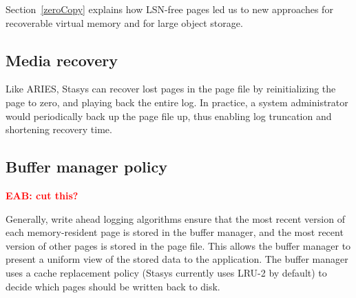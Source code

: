 \documentclass[letterpaper,twocolumn,10pt]{article}
\newcommand{\yad}{Stasys\xspace}
\newcommand{\eab}[1]{\textcolor{red}{\bf EAB: #1}}
\newcommand{\eat}[1]{}
\begin{document}
Section~\ref{zeroCopy} explains how LSN-free pages led us to new 
approaches for recoverable virtual memory and for large object storage.

\subsection{Media recovery}

Like ARIES, \yad can recover lost pages in the page file by
reinitializing the page to zero, and playing back the entire log.  In
practice, a system administrator would periodically back up the page file
up, thus enabling log truncation and shortening recovery time.

\eat{  This is pretty redundant.
\subsection{Modular operations semantics}

The smallest unit of a \yad transaction is the {\em operation}.  An
operation consists of a {\em redo} function, {\em undo} function, and
a log format.  At runtime or if recovery decides to reapply the
operation, the redo function is invoked with the contents of the log
entry as an argument.  During abort, or if recovery decides to undo
the operation, the undo function is invoked with the contents of the
log as an argument.  Like Berkeley DB, and most database toolkits, we
allow system designers to define new operations.  Unlike earlier
systems, we have based our library of operations on object oriented
collection libraries, and have built complex index structures from
simpler structures.  These modules are all directly avaialable,
providing a wide range of data structures to applications, and
facilitating the develop of more complex structures through reuse.  We
compare the peroformance of our modular approach with a monolithic
implementation on top of \yad, using Berkeley DB as a baseline.
}

\subsection{Buffer manager policy}

\eab{cut this?}

Generally, write ahead logging algorithms ensure that the most recent
version of each memory-resident page is stored in the buffer manager,
and the most recent version of other pages is stored in the page file.
This allows the buffer manager to present a uniform view of the stored
data to the application.  The buffer manager uses a cache replacement
policy (\yad currently uses LRU-2 by default) to decide which pages
should be written back to disk.
\end{document}
